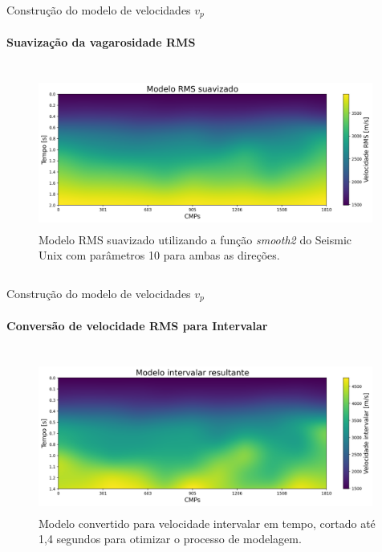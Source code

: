 \documentclass[xcolor=dvipsnames,t]{beamer}
\begin{document}
\begin{frame}{Construção do modelo de velocidades $v_p$}
	\framesubtitle{Suavização da vagarosidade RMS}	
		
	\begin{columns}[onlytextwidth, T]
		\begin{column}{.9\textwidth}
			\begin{figure}[h]
				\includegraphics[width=11cm,height=5cm]{../imagens/modeloSuavizadoRMS.png}	
				\tiny{\caption{Modelo RMS suavizado utilizando a função \textit{smooth2} do Seismic Unix com parâmetros 10 para ambas as direções.}} 	
			\end{figure}			
		\end{column}
	\end{columns}	
	
\end{frame}
\begin{frame}{Construção do modelo de velocidades $v_p$}
	\framesubtitle{Conversão de velocidade RMS para Intervalar}	
		
	\begin{columns}[onlytextwidth, T]
		\begin{column}{.9\textwidth}
			\begin{figure}[h]
				\includegraphics[width=11cm,height=5cm]{../imagens/modeloSuavizadoINTUTIL.png}	
				\tiny{\caption{Modelo convertido para velocidade intervalar em tempo, cortado até 1,4 segundos para otimizar o processo de modelagem.}} 	
			\end{figure}			
		\end{column}
	\end{columns}	
	
\end{frame}
\end{document}
